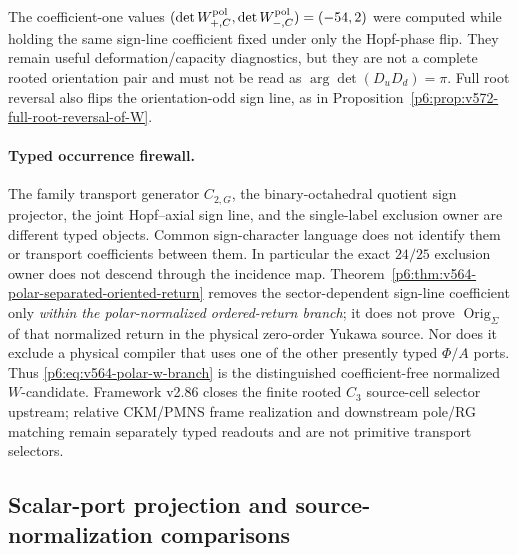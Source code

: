 \documentclass[11pt,a4paper]{article}
\begin{document}
\begin{remark}
\label{p6:rem:v572-old-w-pair-not-strong-cp}
The coefficient-one values
\((\det W_{+,C}^{\rm pol},\det W_{-,C}^{\rm pol})=(-54,2)\)
were computed while holding the same sign-line coefficient fixed under only
the Hopf-phase flip.  They remain useful deformation/capacity diagnostics,
but they are not a complete rooted orientation pair and must not be read as
\(\arg\det(D_uD_d)=\pi\).  Full root reversal also flips the orientation-odd
sign line, as in Proposition~\ref{p6:prop:v572-full-root-reversal-of-W}.
\end{remark}

\paragraph{Typed occurrence firewall.}
The family transport generator \(C_{2,G}\), the binary-octahedral quotient
sign projector, the joint Hopf--axial sign line, and the single-label
exclusion owner are different typed objects.  Common sign-character language
does not identify them or transport coefficients between them.  In
particular the exact \(24/25\) exclusion owner does not descend through the
incidence map.  Theorem~\ref{p6:thm:v564-polar-separated-oriented-return}
removes the sector-dependent sign-line coefficient only \emph{within the
polar-normalized ordered-return branch}; it does not prove
\(\operatorname{Orig}_\Sigma\) of that normalized return in the physical
zero-order Yukawa source.  Nor does it exclude a physical compiler that uses
one of the other presently typed \(\Phi/A\) ports.  Thus
\eqref{p6:eq:v564-polar-w-branch} is the distinguished coefficient-free
normalized \(W\)-candidate.  Framework v2.86 closes the finite rooted $C_3$ source-cell selector upstream; relative CKM/PMNS frame realization and downstream pole/RG matching remain separately typed readouts and are not primitive transport selectors.

\subsection{Scalar-port projection and source-normalization comparisons}
\label{p6:app:v2168-transfer-diagnostics}
\end{document}

